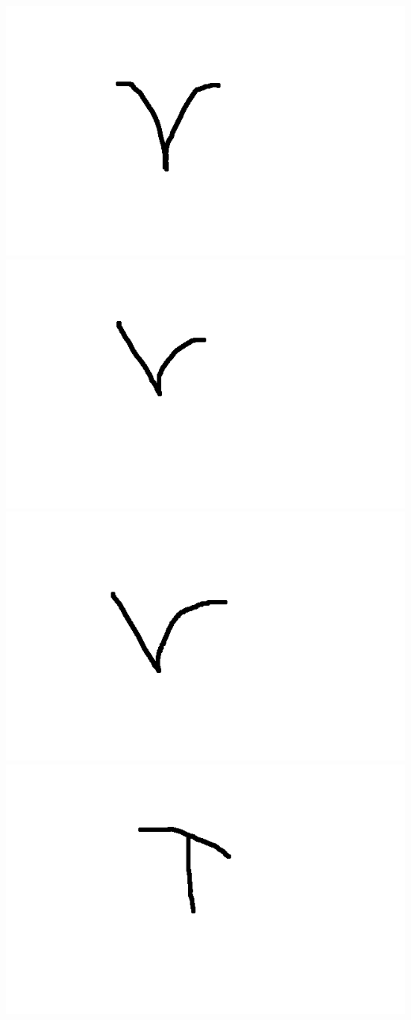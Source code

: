 \documentclass[a4paper,12px,twocolumn]{article}
\begin{document}
\begin{flushleft}
        \includegraphics[scale=0.1]{tv11}
        \includegraphics[scale=0.1]{tv12}
        \includegraphics[scale=0.1]{tv13}
        \includegraphics[scale=0.1]{tT11}

\end{flushleft}
\end{document}
